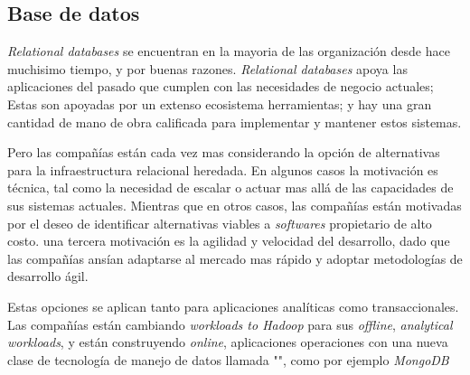 

\subsection{Base de datos}

\textit{Relational databases} se encuentran en la mayoria de las organización desde hace muchisimo tiempo, y por buenas razones. \textit{Relational databases} apoya las aplicaciones del pasado que cumplen con las necesidades de negocio actuales; Estas son apoyadas por un extenso ecosistema herramientas; y hay una gran cantidad de mano de obra calificada para implementar y mantener estos sistemas.

Pero las compañías están cada vez mas considerando la opción de alternativas para la infraestructura relacional heredada. En algunos casos la motivación es técnica, tal como la necesidad de escalar o actuar mas allá de las capacidades de sus sistemas actuales. Mientras que en otros casos, las compañías están motivadas por el deseo de identificar alternativas viables a \textit{softwares} propietario de alto costo. una tercera motivación es la agilidad y velocidad del desarrollo, dado que las compañías ansían adaptarse al mercado mas rápido y adoptar metodologías de desarrollo ágil.

Estas opciones se aplican tanto para aplicaciones analíticas como transaccionales. Las compañías están cambiando \textit{workloads to Hadoop} para sus \textit{offline}, \textit{analytical workloads}, y están construyendo \textit{online}, aplicaciones operaciones con una nueva clase de tecnología de manejo de datos llamada "", como por ejemplo \textit{MongoDB}

